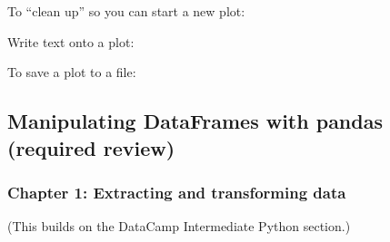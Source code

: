 \documentclass[letterpaper,10pt,english]{sphinxmanual}
\begin{document}
To “clean up” so you can start a new plot:

\begin{sphinxVerbatim}[commandchars=\\\{\}]
\end{sphinxVerbatim}

Write text onto a plot:

\begin{sphinxVerbatim}[commandchars=\\\{\}]
    
\end{sphinxVerbatim}

To save a plot to a file:

\begin{sphinxVerbatim}[commandchars=\\\{\}]
    
\end{sphinxVerbatim}


\subsection{Manipulating DataFrames with pandas (required review)}
\label{\detokenize{big-cheat-sheet:manipulating-dataframes-with-pandas-required-review}}

\subsubsection{Chapter 1: Extracting and transforming data}
\label{\detokenize{big-cheat-sheet:chapter-1-extracting-and-transforming-data}}
(This builds on the DataCamp Intermediate Python section.)
\end{document}
